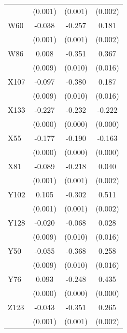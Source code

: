 \begin{table}[htbp]
\begin{tabular}{l*{3}{c}}
                &  (0.001)         &  (0.001)         &  (0.002)         \\
W60             &   -0.038\sym{***}&   -0.257\sym{***}&    0.181\sym{***}\\
                &  (0.001)         &  (0.001)         &  (0.002)         \\
W86             &    0.008         &   -0.351\sym{***}&    0.367\sym{***}\\
                &  (0.009)         &  (0.010)         &  (0.016)         \\
X107            &   -0.097\sym{***}&   -0.380\sym{***}&    0.187\sym{***}\\
                &  (0.009)         &  (0.010)         &  (0.016)         \\
X133            &   -0.227\sym{***}&   -0.232\sym{***}&   -0.222\sym{***}\\
                &  (0.000)         &  (0.000)         &  (0.000)         \\
X55             &   -0.177\sym{***}&   -0.190\sym{***}&   -0.163\sym{***}\\
                &  (0.000)         &  (0.000)         &  (0.000)         \\
X81             &   -0.089\sym{***}&   -0.218\sym{***}&    0.040\sym{***}\\
                &  (0.001)         &  (0.001)         &  (0.002)         \\
Y102            &    0.105\sym{***}&   -0.302\sym{***}&    0.511\sym{***}\\
                &  (0.001)         &  (0.001)         &  (0.002)         \\
Y128            &   -0.020\sym{**} &   -0.068\sym{***}&    0.028\sym{*}  \\
                &  (0.009)         &  (0.010)         &  (0.016)         \\
Y50             &   -0.055\sym{***}&   -0.368\sym{***}&    0.258\sym{***}\\
                &  (0.009)         &  (0.010)         &  (0.016)         \\
Y76             &    0.093\sym{***}&   -0.248\sym{***}&    0.435\sym{***}\\
                &  (0.000)         &  (0.000)         &  (0.000)         \\
Z123            &   -0.043\sym{***}&   -0.351\sym{***}&    0.265\sym{***}\\
                &  (0.001)         &  (0.001)         &  (0.002)         \\

\end{tabular}
\end{table}

